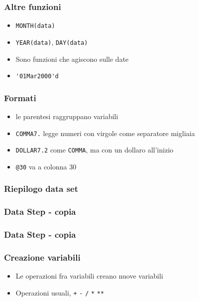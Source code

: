 \documentclass[aspectratio=169]{beamer}
\begin{document}
\begin{frame}[fragile]\frametitle{Altre funzioni}
  \begin{itemize}
  \item
    \verb!MONTH(data)!
  \item
    \verb!YEAR(data)!,  \verb!DAY(data)!
  \item
    Sono funzioni che agiscono sulle date
  \item
    \verb!'01Mar2000'd!
  \end{itemize}
\end{frame}



\begin{frame}[containsverbatim]\frametitle{Formati}

  \begin{itemize}
  \item
    le parentesi raggruppano variabili
  \item
    \verb!COMMA7.! legge numeri con virgole come separatore migliaia
  \item
    \verb!DOLLAR7.2! come \verb!COMMA!, ma con un dollaro all'inizio
  \item
    \verb!@30! va a colonna 30
  \end{itemize}
\end{frame}



\begin{frame}[containsverbatim]\frametitle{Riepilogo data set}
\end{frame}


\begin{frame}[fragile]\frametitle{Data Step - copia }
\end{frame}


\begin{frame}[fragile]\frametitle{Data Step - copia }
\end{frame}



\begin{frame}[fragile]\frametitle{Creazione variabili}

  \begin{itemize}
  \item
    Le operazioni fra variabili creano nuove variabili
  \item
    Operazioni usuali, \verb!+! \verb!-! \verb!/! \verb!*! \verb!**!
  \end{itemize}
\end{frame}
\end{document}
